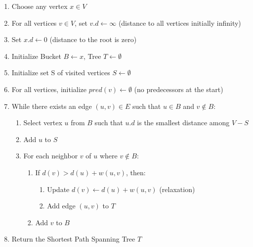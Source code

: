 \documentclass[a4paper]{exam}
\begin{document}
\begin{questions}
\begin{parts}
\begin{solution}
    \begin{enumerate}
      \item Choose any vertex \( x \in V \)
      \item For all vertices \( v \in V \), set \( v.d \leftarrow \infty \) (distance to all vertices initially infinity)
      \item Set \( x.d \leftarrow 0 \) (distance to the root is zero)
      \item Initialize Bucket $B \leftarrow x$, Tree $T \leftarrow \emptyset$
      \item Initialize set S of visited vertices \( S \leftarrow \emptyset \)
      \item For all vertices, initialize \( pred(v) \leftarrow \emptyset \) (no predecessors at the start)
      \item While there exists an edge $(u, v) \in E$ such that $u \in B$ and $v \not\in B$:      
      \begin{enumerate}
        \item Select vertex \( u \) from \( B \) such that \( u.d \) is the smallest distance among $V - S$
        \item Add \( u \) to \( S \)
        \item For each neighbor \( v \) of \( u \) where \( v \notin B \):
        \begin{enumerate}
          \item If \( d(v) > d(u) + w(u, v) \), then:
          \begin{enumerate}
            \item Update \( d(v) \leftarrow d(u) + w(u, v) \) (relaxation)
            \item Add edge \( (u, v) \) to \( T \)
          \end{enumerate}
        \item Add \( v \) to \( B \)
        \end{enumerate}
      \end{enumerate}
      \item Return the Shortest Path Spanning Tree \( T \)
    \end{enumerate}
    
  
    \end{solution}

\end{parts}
\end{questions}
\end{document}
